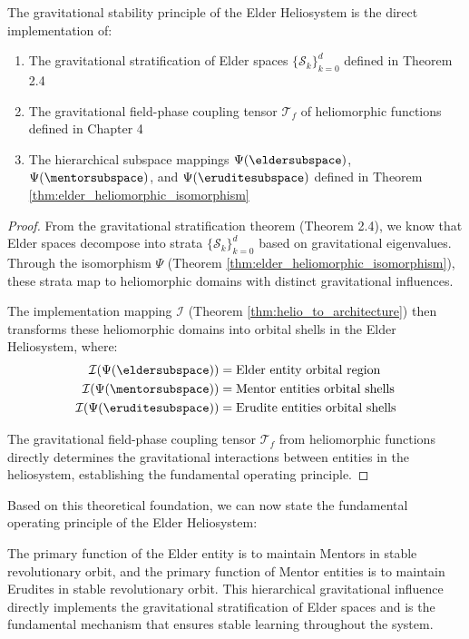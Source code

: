 \begin{theorem}
\label{thm:gravitational_stability_implementation}
The gravitational stability principle of the Elder Heliosystem is the direct implementation of:
\begin{enumerate}
    \item The gravitational stratification of Elder spaces $\{\mathcal{S}_k\}_{k=0}^d$ defined in Theorem 2.4
    \item The gravitational field-phase coupling tensor $\mathcal{T}_f$ of heliomorphic functions defined in Chapter 4
    \item The hierarchical subspace mappings $\Psi(\eldersubspace)$, $\Psi(\mentorsubspace)$, and $\Psi(\eruditesubspace)$ defined in Theorem \ref{thm:elder_heliomorphic_isomorphism}
\end{enumerate}
\end{theorem}

\begin{proof}
From the gravitational stratification theorem (Theorem 2.4), we know that Elder spaces decompose into strata $\{\mathcal{S}_k\}_{k=0}^d$ based on gravitational eigenvalues. Through the isomorphism $\Psi$ (Theorem \ref{thm:elder_heliomorphic_isomorphism}), these strata map to heliomorphic domains with distinct gravitational influences.

The implementation mapping $\mathcal{I}$ (Theorem \ref{thm:helio_to_architecture}) then transforms these heliomorphic domains into orbital shells in the Elder Heliosystem, where:
\begin{align}
\mathcal{I}(\Psi(\eldersubspace)) &= \text{Elder entity orbital region}\\
\mathcal{I}(\Psi(\mentorsubspace)) &= \text{Mentor entities orbital shells}\\
\mathcal{I}(\Psi(\eruditesubspace)) &= \text{Erudite entities orbital shells}
\end{align}

The gravitational field-phase coupling tensor $\mathcal{T}_f$ from heliomorphic functions directly determines the gravitational interactions between entities in the heliosystem, establishing the fundamental operating principle.
\end{proof}

Based on this theoretical foundation, we can now state the fundamental operating principle of the Elder Heliosystem:

\begin{definition}
\label{def:fundamental_principle}
The primary function of the Elder entity is to maintain Mentors in stable revolutionary orbit, and the primary function of Mentor entities is to maintain Erudites in stable revolutionary orbit. This hierarchical gravitational influence directly implements the gravitational stratification of Elder spaces and is the fundamental mechanism that ensures stable learning throughout the system.
\end{definition}

